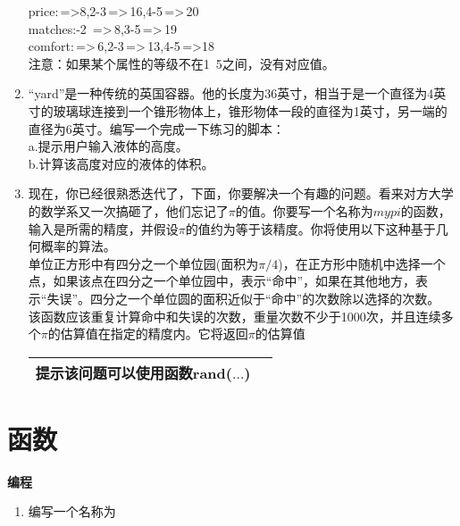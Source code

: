 \documentclass[UTF8]{ctexart}
\begin{document}
\begin{enumerate}
	price:\,=>8,2-3\,=>\,16,4-5\,=>\,20\\
	matches:-2 \,=>\,8,3-5\,=>\,19\\
	comfort:\,=>\,6,2-3\,=>\,13,4-5\,=>18\\
	注意：如果某个属性的等级不在1~5之间，没有对应值。
	\item “yard”是一种传统的英国容器。他的长度为36英寸，相当于是一个直径为4英寸的玻璃球连接到一个锥形物体上，锥形物体一段的直径为1英寸，另一端的直径为6英寸。编写一个完成一下练习的脚本：\\
	a.提示用户输入液体的高度。\\
	b.计算该高度对应的液体的体积。
	\item 现在，你已经很熟悉迭代了，下面，你要解决一个有趣的问题。看来对方大学的数学系又一次搞砸了，他们忘记了$\pi$的值。你要写一个名称为$mypi$的函数，输入是所需的精度，并假设$\pi$的值约为等于该精度。你将使用以下这种基于几何概率的算法。\\
	单位正方形中有四分之一个单位园(面积为$\pi/4$)，在正方形中随机中选择一个点，如果该点在四分之一个单位园中，表示“命中”，如果在其他地方，表示“失误”。四分之一个单位圆的面积近似于“命中”的次数除以选择的次数。\\该函数应该重复计算命中和失误的次数，重量次数不少于1000次，并且连续多个$\pi$的估算值在指定的精度内。它将返回$\pi$的估算值\\
	\begin{table}[H]
		\centering
		\begin{tabular}{|p{10cm}|l|}
		\hline
		\textbf{提示}\qquad 该问题可以使用函数rand($\dots$)\\
		\hline
		\end{tabular}
	\end{table}
\end{enumerate}
\section{函数}
\textbf{编程}
\begin{enumerate}
\item 编写一个名称为
\end{enumerate}
\end{document}
